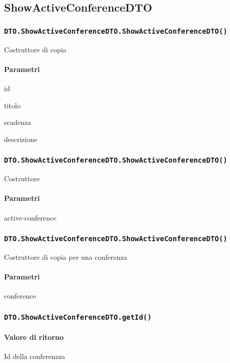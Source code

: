 \subsection{ShowActiveConferenceDTO}
\subsubsection{\texttt{DTO.ShowActiveConferenceDTO.ShowActiveConferenceDTO()}}
Costruttore di copia
\paragraph{Parametri}
\begin{description}
\item id
\item titolo
\item scadenza
\item descrizione
\end{description}
\subsubsection{\texttt{DTO.ShowActiveConferenceDTO.ShowActiveConferenceDTO()}}
Costruttore
\paragraph{Parametri}
\begin{description}
\item active-conference
\end{description}
\subsubsection{\texttt{DTO.ShowActiveConferenceDTO.ShowActiveConferenceDTO()}}
Costruttore di copia per una conferenza
\paragraph{Parametri}
\begin{description}
\item conference
\end{description}
\subsubsection{\texttt{DTO.ShowActiveConferenceDTO.getId()}}
\paragraph{Valore di ritorno}
\begin{description}
\item Id della conferenzza
\end{description}
